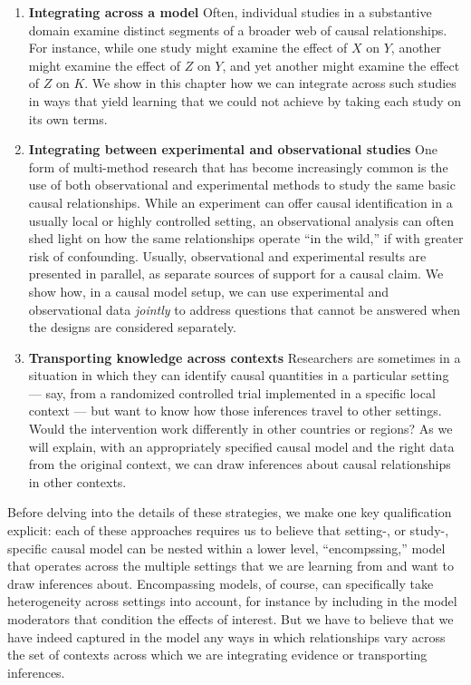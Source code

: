 \documentclass[
  12pt,
]{book}
\begin{document}
\begin{enumerate}
\def\labelenumi{\arabic{enumi}.}
\item
  \textbf{Integrating across a model} Often, individual studies in a substantive domain examine distinct segments of a broader web of causal relationships. For instance, while one study might examine the effect of \(X\) on \(Y\), another might examine the effect of \(Z\) on \(Y\), and yet another might examine the effect of \(Z\) on \(K\). We show in this chapter how we can integrate across such studies in ways that yield learning that we could not achieve by taking each study on its own terms.
\item
  \textbf{Integrating between experimental and observational studies} One form of multi-method research that has become increasingly common is the use of both observational and experimental methods to study the same basic causal relationships. While an experiment can offer causal identification in a usually local or highly controlled setting, an observational analysis can often shed light on how the same relationships operate ``in the wild,'' if with greater risk of confounding. Usually, observational and experimental results are presented in parallel, as separate sources of support for a causal claim. We show how, in a causal model setup, we can use experimental and observational data \emph{jointly} to address questions that cannot be answered when the designs are considered separately.
\item
  \textbf{Transporting knowledge across contexts} Researchers are sometimes in a situation in which they can identify causal quantities in a particular setting --- say, from a randomized controlled trial implemented in a specific local context --- but want to know how those inferences travel to other settings. Would the intervention work differently in other countries or regions? As we will explain, with an appropriately specified causal model and the right data from the original context, we can draw inferences about causal relationships in other contexts.
\end{enumerate}

Before delving into the details of these strategies, we make one key qualification explicit: each of these approaches requires us to believe that setting-, or study-, specific causal model can be nested within a lower level, ``encompssing,'' model that operates across the multiple settings that we are learning from and want to draw inferences about. Encompassing models, of course, can specifically take heterogeneity across settings into account, for instance by including in the model moderators that condition the effects of interest. But we have to believe that we have indeed captured in the model any ways in which relationships vary across the set of contexts across which we are integrating evidence or transporting inferences.
\end{document}
